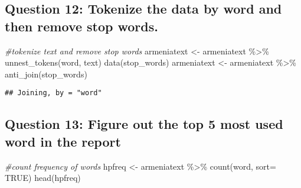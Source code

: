 \documentclass[
]{article}
\newenvironment{Shaded}{\begin{snugshade}}{\end{snugshade}}
\newcommand{\AttributeTok}[1]{\textcolor[rgb]{0.77,0.63,0.00}{#1}}
\newcommand{\CommentTok}[1]{\textcolor[rgb]{0.56,0.35,0.01}{\textit{#1}}}
\newcommand{\ConstantTok}[1]{\textcolor[rgb]{0.00,0.00,0.00}{#1}}
\newcommand{\DecValTok}[1]{\textcolor[rgb]{0.00,0.00,0.81}{#1}}
\newcommand{\FunctionTok}[1]{\textcolor[rgb]{0.00,0.00,0.00}{#1}}
\newcommand{\NormalTok}[1]{#1}
\newcommand{\OtherTok}[1]{\textcolor[rgb]{0.56,0.35,0.01}{#1}}
\newcommand{\SpecialCharTok}[1]{\textcolor[rgb]{0.00,0.00,0.00}{#1}}
\newcommand{\StringTok}[1]{\textcolor[rgb]{0.31,0.60,0.02}{#1}}
\begin{document}
\begin{Shaded}
\end{Shaded}

\hypertarget{question-12-tokenize-the-data-by-word-and-then-remove-stop-words.}{%
\subsection{Question 12: Tokenize the data by word and then remove stop
words.}\label{question-12-tokenize-the-data-by-word-and-then-remove-stop-words.}}

\begin{Shaded}
\begin{Highlighting}[]
\CommentTok{\#tokenize text and remove stop words}
\NormalTok{armeniatext }\OtherTok{\textless{}{-}}\NormalTok{ armeniatext }\SpecialCharTok{\%\textgreater{}\%} \FunctionTok{unnest\_tokens}\NormalTok{(word, text)}
\FunctionTok{data}\NormalTok{(stop\_words)}
\NormalTok{armeniatext }\OtherTok{\textless{}{-}}\NormalTok{ armeniatext }\SpecialCharTok{\%\textgreater{}\%} \FunctionTok{anti\_join}\NormalTok{(stop\_words)}
\end{Highlighting}
\end{Shaded}

\begin{verbatim}
## Joining, by = "word"
\end{verbatim}

\hypertarget{question-13-figure-out-the-top-5-most-used-word-in-the-report}{%
\subsection{Question 13: Figure out the top 5 most used word in the
report}\label{question-13-figure-out-the-top-5-most-used-word-in-the-report}}

\begin{Shaded}
\begin{Highlighting}[]
\CommentTok{\#count frequency of words}
\NormalTok{hpfreq }\OtherTok{\textless{}{-}}\NormalTok{ armeniatext }\SpecialCharTok{\%\textgreater{}\%} \FunctionTok{count}\NormalTok{(word, }\AttributeTok{sort=} \ConstantTok{TRUE}\NormalTok{)}
\FunctionTok{head}\NormalTok{(hpfreq)}
\end{Highlighting}
\end{Shaded}
\end{document}
